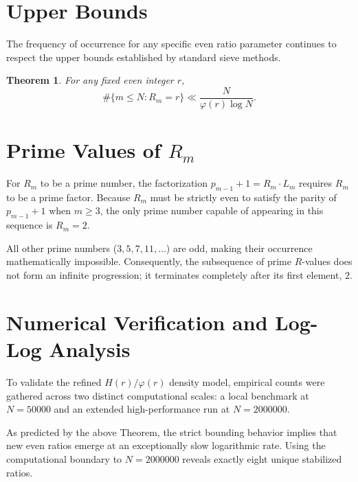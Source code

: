 \documentclass[11pt,fleqn]{article}
\newtheorem{theorem}{Theorem}
\begin{document}
\section{Upper Bounds}
The frequency of occurrence for any specific even ratio parameter continues to respect the upper bounds established by standard sieve methods.
\begin{theorem}
For any fixed even integer $r$,
\begin{equation*}
    \#\{m \leq N : R_m = r\} \ll \frac{N}{\varphi(r) \log N}.
\end{equation*}
\end{theorem}

\section{Prime Values of $R_m$}
For $R_m$ to be a prime number, the factorization $p_{m-1} + 1 = R_m \cdot L_m$ requires $R_m$ to be a prime factor. Because $R_m$ must be strictly even to satisfy the parity of $p_{m-1}+1$ when $m \geq 3$, the only prime number capable of appearing in this sequence is $R_m = 2$. 

All other prime numbers ($3, 5, 7, 11, \dots$) are odd, making their occurrence mathematically impossible. Consequently, the subsequence of prime $R$-values does not form an infinite progression; it terminates completely after its first element, $2$.

\section{Numerical Verification and Log-Log Analysis}
To validate the refined $H(r)/\varphi(r)$ density model, empirical counts were gathered across two distinct computational scales: a local benchmark at $N = 50000$ and an extended high-performance run at $N = 2000000$. 

As predicted by the above Theorem, the strict bounding behavior implies that new even ratios emerge at an exceptionally slow logarithmic rate. Using the computational boundary to $N = 2000000$ reveals exactly eight unique stabilized ratios. 
\end{document}
